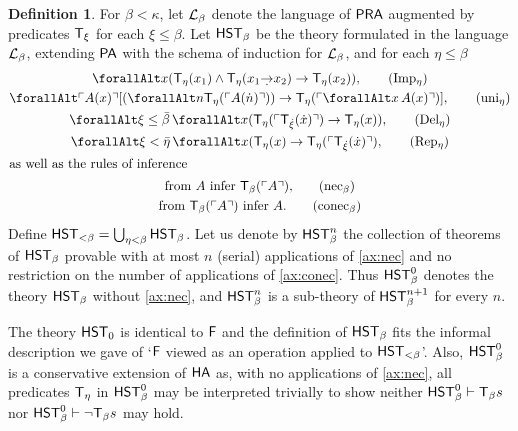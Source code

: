 \documentclass[UKenglish,cleveref,DIV=12]{scrartcl}
\let\forall\forallAlt
\theoremstyle{definition}
\newtheorem{definition}[lemma]{Definition}
\theoremstyle{definition}
\begin{document}
\begin{definition}%
For $\beta<\kappa$, let $\mathcal{L}_\beta$ denote the language of $\mathsf{PRA}$ augmented by
predicates  $\mathsf{T}_\xi$ for each $\xi\le\beta$. Let $\mathsf{HST}_\beta$ be the theory
formulated in the language $\mathcal{L}_\beta$, extending $\mathsf{PA}$ with the schema of
induction for $\mathcal{L}_\beta$, and for each $\eta\le\beta$
\begin{gather}
  \forall x(\T_\eta(x_1)\land \T_\eta(x_1\dimplies x_2)\rightarrow \T_\eta(x_2)),
	  \tag{\Imp{\eta}}\label{ax:imp}\\
  \forall\gn {A(x)}[(\forall n \T_\eta(\gn{A(\dot n)}))\rightarrow
	\T_{\eta}(\gn{\forall x \,A(x)})],
	  \tag{uni$_\eta$}\label{ax:uni}\\
  \forall \xi\le\bar\beta\,\forall x( \T_\eta(\gn{\T_{\dot{\xi}}(\dot
	x)})\rightarrow \T_\eta(x)),
	  \tag{\Del{\eta}}\label{ax:del}\\
  \forall \xi<\bar\eta \,\forall x(\T_\eta(x)\rightarrow\T_\eta(\gn{
	  \T_{\dot{\xi}}(\dot x)}),
	  \tag{\Rep{\eta}}\label{ax:rep}\\
\intertext{as well as the rules of inference}
  \text{from $A$ infer $\T_\beta(\gn A)$,}\tag{nec$_\beta$}
	  \label{ax:nec}\\
  \text{from $\T_\beta(\gn A)$ infer $A$.}\tag{conec$_\beta$}
	  \label{ax:conec}
\end{gather}
Define $\mathsf{HST}_{<\beta}=\bigcup_{\eta<\beta}\mathsf{HST}_\beta$. Let us denote by $\mathsf{HST}_\beta^n$
the collection of theorems of $\mathsf{HST}_\beta$ provable with at most $n$ (serial) applications
of \eqref{ax:nec} and no restriction on the number of applications of
\eqref{ax:conec}. 
Thus $\mathsf{HST}_\beta^0$ denotes the theory $\mathsf{HST}_\beta$ without
\eqref{ax:nec}, and
$\mathsf{HST}_\beta^n$ is a sub-theory of $\mathsf{HST}_\beta^{n+1}$ for every $n$.
\end{definition}

The theory $\mathsf{HST}_0$ is identical to $\mathsf{F}$ and the definition of $\mathsf{HST}_{\beta}$ fits
the informal description we gave of `$\mathsf{F}$ viewed as an operation applied to
$\mathsf{HST}_{<\beta}$'. Also, $\mathsf{HST}_\beta^0$ is a conservative extension of
$\mathsf{HA}$ as, with no applications of \eqref{ax:nec}, all predicates $\mathsf{T}_\eta$ in
$\mathsf{HST}_\beta^0$ may be interpreted trivially to show neither $\mathsf{HST}_\beta^0\vdash
\mathsf{T}_\beta s$ nor $\mathsf{HST}_\beta^0\vdash \lnot \mathsf{T}_\beta s$ may hold.
\end{document}
